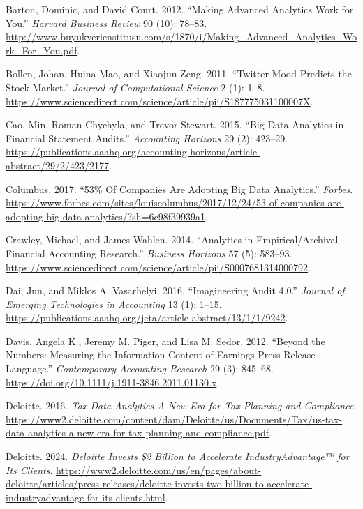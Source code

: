 \documentclass[
  letterpaper,
  DIV=11,
  numbers=noendperiod]{scrreprt}
\newlength{\cslhangindent}
\newenvironment{CSLReferences}[2] %
 {\begin{list}{}{%
  \setlength{\itemindent}{0pt}
  \setlength{\leftmargin}{0pt}
  \setlength{\parsep}{0pt}
  \ifodd #1
   \setlength{\leftmargin}{\cslhangindent}
   \setlength{\itemindent}{-1\cslhangindent}
  \fi
  \setlength{\itemsep}{#2\baselineskip}}}
 {\end{list}}
\begin{document}
\begin{CSLReferences}{1}{1}
Barton, Dominic, and David Court. 2012. {``Making Advanced Analytics
Work for You.''} \emph{Harvard Business Review} 90 (10): 78--83.
\url{http://www.buyukverienstitusu.com/s/1870/i/Making_Advanced_Analytics_Work_For_You.pdf}.

Bollen, Johan, Huina Mao, and Xiaojun Zeng. 2011. {``Twitter Mood
Predicts the Stock Market.''} \emph{Journal of Computational Science} 2
(1): 1--8.
\url{https://www.sciencedirect.com/science/article/pii/S187775031100007X}.

Cao, Min, Roman Chychyla, and Trevor Stewart. 2015. {``Big Data
Analytics in Financial Statement Audits.''} \emph{Accounting Horizons}
29 (2): 423--29.
\url{https://publications.aaahq.org/accounting-horizons/article-abstract/29/2/423/2177}.

Columbus. 2017. {``53\% {Of} {Companies} {Are} {Adopting} {Big} {Data}
{Analytics}.''} \emph{Forbes}.
\url{https://www.forbes.com/sites/louiscolumbus/2017/12/24/53-of-companies-are-adopting-big-data-analytics/?sh=6c98f39939a1}.

Crawley, Michael, and James Wahlen. 2014. {``Analytics in
Empirical/Archival Financial Accounting Research.''} \emph{Business
Horizons} 57 (5): 583--93.
\url{https://www.sciencedirect.com/science/article/pii/S0007681314000792}.

Dai, Jun, and Miklos A. Vasarhelyi. 2016. {``Imagineering {Audit}
4.0.''} \emph{Journal of Emerging Technologies in Accounting} 13 (1):
1--15.
\url{https://publications.aaahq.org/jeta/article-abstract/13/1/1/9242}.

Davis, Angela K., Jeremy M. Piger, and Lisa M. Sedor. 2012. {``Beyond
the {Numbers}: {Measuring} the {Information} {Content} of {Earnings}
{Press} {Release} {Language}.''} \emph{Contemporary Accounting Research}
29 (3): 845--68. \url{https://doi.org/10.1111/j.1911-3846.2011.01130.x}.

Deloitte. 2016. \emph{Tax {Data} {Analytics} {A} {New} {Era} for {Tax}
{Planning} and {Compliance}}.
\url{https://www2.deloitte.com/content/dam/Deloitte/us/Documents/Tax/us-tax-data-analytics-a-new-era-for-tax-planning-and-compliance.pdf}.

Deloitte. 2024. \emph{Deloitte Invests \$2 Billion to Accelerate
IndustryAdvantage™ for Its Clients}.
\url{https://www2.deloitte.com/us/en/pages/about-deloitte/articles/press-releases/deloitte-invests-two-billion-to-accelerate-industryadvantage-for-its-clients.html}.


\end{CSLReferences}
\end{document}
